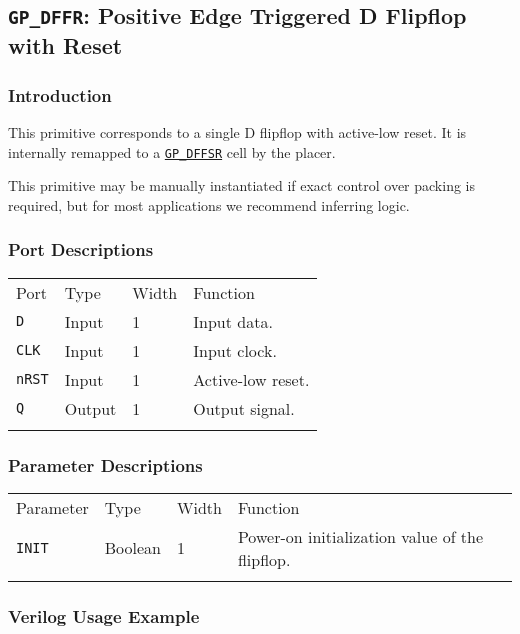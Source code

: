 \documentclass[11pt]{article}
\newcommand{\tokenstyle}[1]{\texttt{#1}}
\newcommand{\whenstyle}[1]{{\fontseries{sb}\selectfont#1}}
\newcommand{\tokenref}[2]{\hyperref[#2]{\tokenstyle{#1}}}
\newcommand{\thinhline}{\Xhline{1\arrayrulewidth}}
\newcommand{\thickhline}{\Xhline{2.5\arrayrulewidth}}
\begin{document}
\pagebreak
\subsection{\tokenstyle{GP\_DFFR}: Positive Edge Triggered D Flipflop with Reset}
\label{gp-dffr}

\subsubsection{Introduction}
This primitive corresponds to a single D flipflop with active-low reset. It is internally remapped to a
\tokenref{GP\_DFFSR}{gp-dffsr} cell by the placer.

This primitive may be manually instantiated if exact control over packing is required, but for most applications we
recommend inferring logic.

\subsubsection{Port Descriptions}

\begin{tabularx}{\textwidth}{lllX}
\thinhline
\whenstyle{Port} & \whenstyle{Type} & \whenstyle{Width} & \whenstyle{Function} \\
\thickhline
\tokenstyle{D} & Input & 1 & Input data. \\
\thinhline
\tokenstyle{CLK} & Input & 1 & Input clock. \\
\thinhline
\tokenstyle{nRST} & Input & 1 & Active-low reset. \\
\thinhline
\tokenstyle{Q} & Output & 1 & Output signal. \\
\thinhline
\end{tabularx}

\subsubsection{Parameter Descriptions}

\begin{tabularx}{\textwidth}{lllX}
\thinhline
\whenstyle{Parameter} & \whenstyle{Type} & \whenstyle{Width} & \whenstyle{Function} \\
\thickhline
\tokenstyle{INIT} & Boolean & 1 & Power-on initialization value of the flipflop. \\
\thinhline
\end{tabularx}

\subsubsection{Verilog Usage Example}
\end{document}
